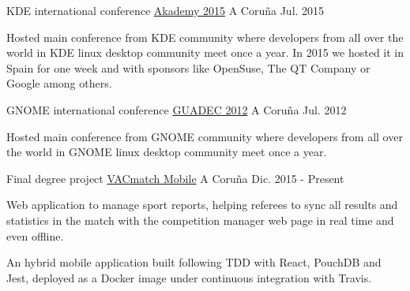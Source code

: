 \begin{cventries}

\cventry
{KDE international conference} %
{\href{https://akademy.kde.org/2015}{Akademy 2015}} %
{A Coruña} %
{Jul. 2015} %
{ %
\begin{cvitems}
Hosted main conference from KDE community where developers from all over the world in KDE linux desktop community meet once a year. In 2015 we hosted it in Spain for one week and with sponsors like OpenSuse, The QT Company or Google among others.
\end{cvitems}
}


\cventry
{GNOME international conference} %
{\href{http://lacomunera.net/2012/08/01/guadec-2012/}{GUADEC 2012}} %
{A Coruña} %
{Jul. 2012} %
{ %
\begin{cvitems}
Hosted main conference from GNOME community where developers from all over the world in GNOME linux desktop community meet once a year.
\end{cvitems}
}


\cventry
{Final degree project} %
{\href{https://github.com/vacmatch/vacmatch-mobile}{VACmatch Mobile}} %
{A Coruña} %
{Dic. 2015 - Present} %
{ %
\begin{cvitems}
\item {Web application to manage sport reports, helping referees to sync all 
results and statistics in the match with the competition manager web page in 
real time and even offline.}
\item {An hybrid mobile application built following TDD with React, PouchDB and 
Jest, deployed as a Docker image under continuous integration with Travis.}
\end{cvitems}
}

\end{cventries}

